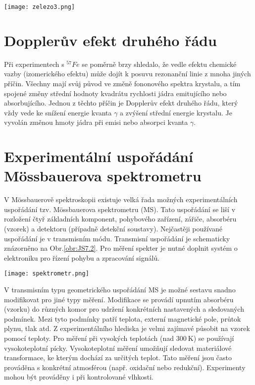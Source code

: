 \documentclass[../../main.tex]{subfiles}
\begin{document}
\begin{center}
	\texttt{[image: zelezo3.png]}
\end{center}

\section{Dopplerův efekt druhého řádu}

Při experimentech s $^{57}Fe$ se poměrně brzy shledalo, že vedle efektu chemické vazby (izomerického efektu) může dojít k posuvu rezonanční linie z mnoha jiných příčin. Všechny mají svůj původ ve změně fononového spektra krystalu, a tím spojené změny střední hodnoty kvadrátu rychlosti jádra emitujícího
nebo absorbujícího. Jednou z těchto příčin je Dopplerův efekt druhého řádu, který vždy vede ke snížení energie kvanta $\gamma$ a zvýšení střední energie krystalu. Je vyvolán změnou hmoty jádra při emisi nebo absorpci kvanta $\gamma$.


\section{Experimentální uspořádání Mössbauerova spektrometru}

V Mössbauerově spektroskopii existuje velká řada možných experimentálních uspořádání tzv. Mössbauerova spektrometru (MS). Tato uspořádání se liší v rozložení čtyř základních komponent, pohybového zařízení, zářiče, absorbéru (vzorek) a detektoru (případně detekční soustavy). Nejčastěji používané uspořádání je v transmisním módu. Transmisní uspořádání je schematicky znázorněno na Obr.\ref{obr:JS7.2}. Pro měření spekter je nutné doplnit systém o elektroniku pro řízení pohybu a zpracování signálů.

\begin{center}
	\texttt{[image: spektrometr.png]}
\end{center}

V transmisním typu geometrického uspořádání MS je možné sestavu snadno modifikovat pro jiné typy měření. Modifikace se provádí upnutím absorbéru (vzorku) do různých komor pro udržení konkrétních nastavených a sledovaných podmínek. Mezi tyto podmínky patří teplota, externí magnetické pole, průtok plynu, tlak atd. Z experimentálního hlediska je velmi zajímavé působit na vzorek pomocí teploty. Pro měření při vysokých teplotách (nad $300 ~\mathrm{K}$) se používají vysokoteplotní pícky. Vysokoteplotní měření umožňují sledovat materiálové transformace, ke kterým dochází za určitých teplot. Tato měření jsou často prováděna s konkrétní atmosférou (např. oxidační nebo redukční). Experimenty mohou být prováděny i při kontrolované vlhkosti.
\end{document}
